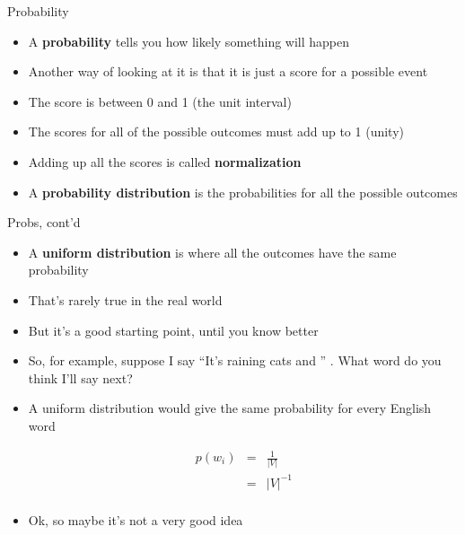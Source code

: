 \documentclass{beamer}
\newcommand{\detail}[1]{{\color{lightgrey}\small{}#1}}
\begin{document}
\begin{frame}{Probability}
\begin{itemize}
	\item A \textbf{probability} tells you how likely something will happen
	\pause
	\item Another way of looking at it is that it is just a score for a possible event
	\pause
	\item The score is between 0 and 1 \detail{(the unit interval)}
	\item The scores for all of the possible outcomes must add up to 1 \detail{(unity)}
	\pause
	\item Adding up all the scores is called \textbf{normalization}
	\pause
	\item A \textbf{probability distribution} is the probabilities for all the possible outcomes
\end{itemize}
\end{frame}


\begin{frame}{Probs, cont'd}
\begin{itemize}
	\item A \textbf{uniform distribution} is where all the outcomes have the same probability
	\pause
	\item That's rarely true in the real world
	\pause
	\item But it's a good starting point, until you know better
	\pause
	\item So, for example, suppose I say ``It's raining cats and \underline{\hspace{2em}}'' .  \pause What word do you think I'll say next?
	\pause
	\item A uniform distribution would give the same probability for every English word
	\vspace*{-1.0em}
	\begin{footnotesize}
	\begin{eqnarray*}
	 p(w_i) & = & \frac{1}{|V|} \\
	        & = & |V|^{-1} \\
	\end{eqnarray*}
	\end{footnotesize}
	\vspace*{-2.0em}
	\pause
	\item Ok, so maybe it's not a very good idea
\end{itemize}
\end{frame}
\end{document}
